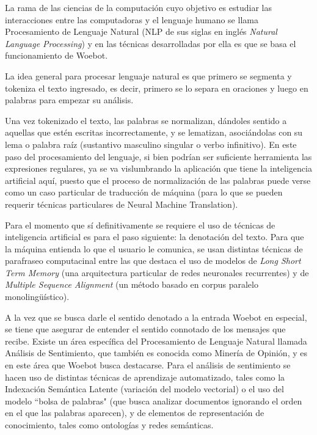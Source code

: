 \documentclass[11pt]{article}
\begin{document}
La rama de las ciencias de la computación cuyo objetivo es estudiar las interacciones entre las computadoras y el lenguaje humano
se llama Procesamiento de Lenguaje Natural (NLP de sus siglas en inglés 
\textit{Natural Language Processing}) y en las técnicas desarrolladas por ella es que  se basa el funcionamiento de Woebot. 

La idea general para procesar lenguaje natural es que primero se segmenta y 
tokeniza el texto ingresado, es decir, primero se lo separa en oraciones y luego 
en palabras para empezar su análisis. 

Una vez tokenizado el texto, las palabras se normalizan, dándoles sentido a aquellas que estén 
escritas incorrectamente, y se lematizan, asociándolas con su lema o palabra raíz (sustantivo 
masculino singular o verbo infinitivo). 
En este paso del procesamiento del lenguaje, si bien podrían ser suficiente herramienta las 
expresiones regulares, ya se va vislumbrando la aplicación que tiene la inteligencia artificial 
aquí, puesto que el proceso de normalización de las palabras puede verse como un caso particular 
de traducción de máquina (para lo que se pueden requerir técnicas particulares de Neural Machine 
Translation).

Para el momento que sí definitivamente se requiere el uso de técnicas de inteligencia artificial 
es para el paso siguiente: la denotación del texto. Para que la máquina entienda lo que 
el usuario le comunica, se usan distintas técnicas de parafraseo computacinal entre las que 
destaca el uso de modelos de \textit{Long Short Term Memory} (una arquitectura particular de redes 
neuronales recurrentes) y de \textit{Multiple Sequence Alignment} (un método basado en corpus paralelo monolingüístico). 

A la vez que se busca darle el sentido denotado a la entrada Woebot en especial, se tiene 
que asegurar de entender el sentido connotado de los mensajes que recibe. Existe un área 
específica del Procesamiento de Lenguaje Natural llamada Análisis de Sentimiento, que también 
es conocida como Minería de Opinión, y es en este área que Woebot busca destacarse. 
Para el análisis de sentimiento se hacen uso de distintas técnicas 
de aprendizaje automatizado, tales como la Indexación Semántica Latente (variación del modelo vectorial)
o el uso del modelo ``bolsa de palabras" (que busca analizar documentos ignorando el orden en el que las palabras aparecen),
 y de elementos de representación de conocimiento, tales 
como ontologías y redes semánticas.
\end{document}
